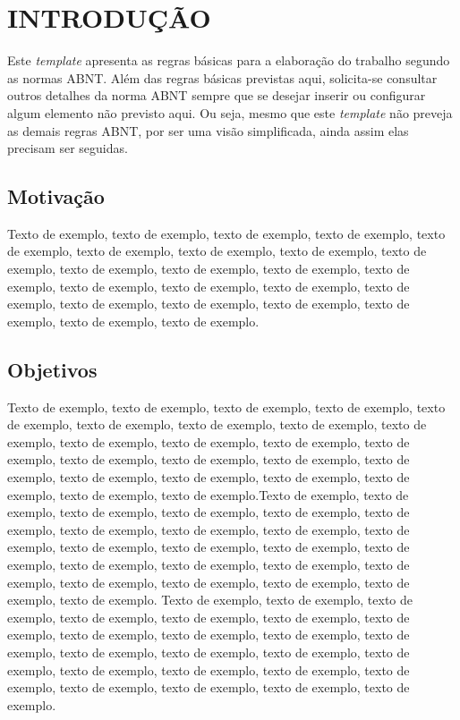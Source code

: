 \chapter{INTRODUÇÃO}\label{cap1}

Este \textit{template} apresenta as regras básicas para a elaboração do trabalho segundo as normas ABNT. Além das regras básicas previstas aqui, solicita-se consultar outros detalhes da norma ABNT sempre que se desejar inserir ou configurar algum elemento não previsto aqui. Ou seja, mesmo que este \textit{template} não preveja as demais regras ABNT, por ser uma visão simplificada, ainda assim elas precisam ser seguidas. 

\section{Motivação}\label{cap11}

Texto de exemplo, texto de exemplo, texto de exemplo, texto de exemplo, texto de exemplo, texto de exemplo, texto de exemplo, texto de exemplo, texto de exemplo, texto de exemplo, texto de exemplo, texto de exemplo, texto de exemplo, texto de exemplo, texto de exemplo, texto de exemplo, texto de exemplo, texto de exemplo, texto de exemplo, texto de exemplo, texto de exemplo, texto de exemplo, texto de exemplo.

\section{Objetivos}\label{cap12}

Texto de exemplo, texto de exemplo, texto de exemplo, texto de exemplo, texto de exemplo, texto de exemplo, texto de exemplo, texto de exemplo, texto de exemplo, texto de exemplo, texto de exemplo, texto de exemplo, texto de exemplo, texto de exemplo, texto de exemplo, texto de exemplo, texto de exemplo, texto de exemplo, texto de exemplo, texto de exemplo, texto de exemplo, texto de exemplo, texto de exemplo.Texto de exemplo, texto de exemplo, texto de exemplo, texto de exemplo, texto de exemplo, texto de exemplo, texto de exemplo, texto de exemplo, texto de exemplo, texto de exemplo, texto de exemplo, texto de exemplo, texto de exemplo, texto de exemplo, texto de exemplo, texto de exemplo, texto de exemplo, texto de exemplo, texto de exemplo, texto de exemplo, texto de exemplo, texto de exemplo, texto de exemplo. Texto de exemplo, texto de exemplo, texto de exemplo, texto de exemplo, texto de exemplo, texto de exemplo, texto de exemplo, texto de exemplo, texto de exemplo, texto de exemplo, texto de exemplo, texto de exemplo, texto de exemplo, texto de exemplo, texto de exemplo, texto de exemplo, texto de exemplo, texto de exemplo, texto de exemplo, texto de exemplo, texto de exemplo, texto de exemplo, texto de exemplo.

